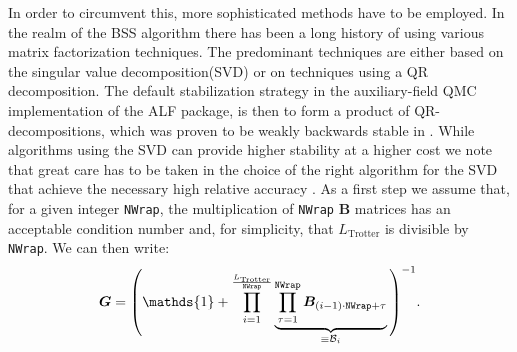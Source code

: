 In order to circumvent this, more sophisticated methods have to be employed.
In the realm of the BSS algorithm there has been a long history \cite{Loh1989, Sorella89, Assaad02,Loh2005, Bai2011, Bauer2020} of using various matrix factorization techniques.
The predominant techniques are either based on the singular value decomposition(SVD) or 
on techniques using a QR decomposition.
The default stabilization strategy in the auxiliary-field QMC implementation of the ALF package, is then to form a product of QR-decompositions, which was proven to be weakly backwards stable in \cite{Bai2011}. While algorithms using the SVD can provide higher stability 
at a higher cost we note that great care has to be taken in the choice of the right
algorithm for the SVD that achieve the necessary high relative accuracy \cite{Demmel1992, Dongarra2018}.
As a first step we assume that, for a given integer \texttt{NWrap}, the multiplication of \texttt{NWrap} $\bm{B}$ matrices has an acceptable condition number and, for simplicity, that $L_{\text{Trotter}}$ is divisible by \texttt{NWrap}. We can then write:
\begin{equation}
\bm{G} = \Vast( \mathds{1} + \prod\limits_{ i = 1}^{\frac{L_{\text{Trotter}}} {\texttt{NWrap}}}       \underbrace{\prod_{\tau=1}^{\texttt{NWrap}} \bm{B}_{(i-1)  \cdot  \texttt{NWrap}+ \tau} }_{ \equiv \mathcal{\bm{B}}_i} \Vast)^{-1}.
\end{equation}

